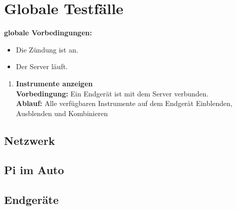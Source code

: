 \documentclass[pflichtenheft.tex]{subfiles}
\begin{document}
\chapter{Globale Testfälle}

\renewcommand{\theenumi}{/GT\ifnum \value{enumi}<10 0\fi\arabic{enumi}0/}
\renewcommand{\labelenumi}{\theenumi}
\renewcommand{\theenumii}{\arabic{enumii}}
\renewcommand{\labelenumii}{GT\ifnum \value{enumi}<10 0\fi\arabic{enumi}\arabic{enumii}/}

\textbf{globale Vorbedingungen:}
\begin{itemize}
\item
Die Zündung ist an.
\item
Der Server läuft.
\end{itemize}

\begin{enumerate}

\item{\textbf{Instrumente anzeigen}} \\
\textbf{Vorbedingung: } Ein Endgerät ist mit dem Server verbunden. \\
\textbf{Ablauf: } Alle verfügbaren Instrumente auf dem Endgerät Einblenden, Ausblenden und Kombinieren

\end{enumerate}

\section{Netzwerk}
\section{Pi im Auto}
\section{Endgeräte}
\end{document}
